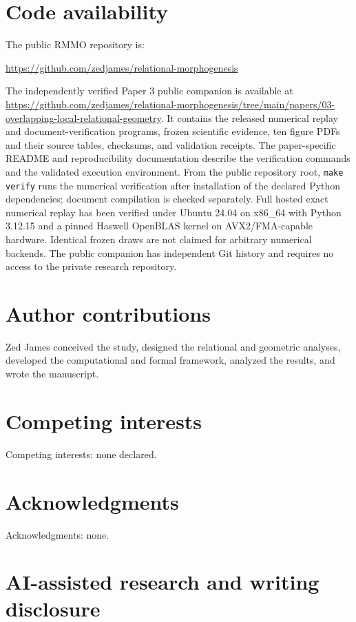 \documentclass[11pt]{article}
\begin{document}
\FloatBarrier
\section{Code availability}

The public RMMO repository is:

\url{https://github.com/zedjames/relational-morphogenesis}

The independently verified Paper 3 public companion is available at \url{https://github.com/zedjames/relational-morphogenesis/tree/main/papers/03-overlapping-local-relational-geometry}. It contains the released numerical replay and document-verification programs, frozen scientific evidence, ten figure PDFs and their source tables, checksums, and validation receipts. The paper-specific README and reproducibility documentation describe the verification commands and the validated execution environment. From the public repository root, \texttt{make verify} runs the numerical verification after installation of the declared Python dependencies; document compilation is checked separately. Full hosted exact numerical replay has been verified under Ubuntu 24.04 on x86\_64 with Python 3.12.15 and a pinned Haswell OpenBLAS kernel on AVX2/FMA-capable hardware. Identical frozen draws are not claimed for arbitrary numerical backends. The public companion has independent Git history and requires no access to the private research repository.

\section{Author contributions}

Zed James conceived the study, designed the relational and geometric analyses, developed the computational and formal framework, analyzed the results, and wrote the manuscript.

\section{Competing interests}

Competing interests: none declared.

\section{Acknowledgments}

Acknowledgments: none.

\section{AI-assisted research and writing disclosure}
\end{document}
